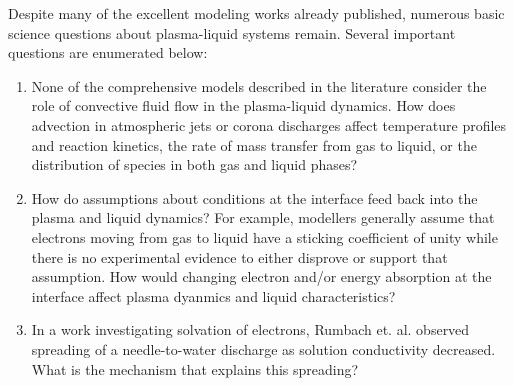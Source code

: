 Despite many of the excellent modeling works already published, numerous basic science questions about plasma-liquid systems remain. Several important questions are enumerated below:

\begin{enumerate}
\item \label{itm:advection} None of the comprehensive models described in the literature consider the role of convective fluid flow in the plasma-liquid dynamics. How does advection in atmospheric jets or corona discharges affect temperature profiles and reaction kinetics, the rate of mass transfer from gas to liquid, or the distribution of species in both gas and liquid phases?
\item \label{itm:interface} How do assumptions about conditions at the interface feed back into the plasma and liquid dynamics? For example, modellers \cite{Tian2014,shirafuji2014numerical} generally assume that electrons moving from gas to liquid have a sticking coefficient of unity while there is no experimental evidence to either disprove or support that assumption. How would changing electron and/or energy absorption at the interface affect plasma dyanmics and liquid characteristics?
\item \label{itm:spreading} In a work investigating solvation of electrons, Rumbach et. al. \cite{rumbach2015solvation} observed spreading of a needle-to-water discharge as solution conductivity decreased. What is the mechanism that explains this spreading?
\end{enumerate}


